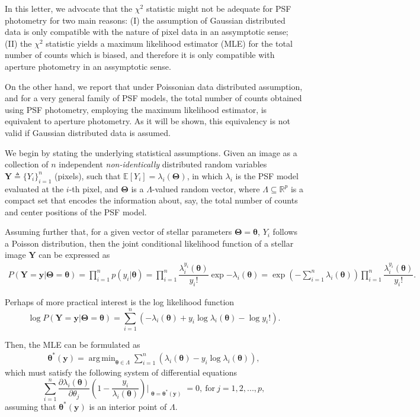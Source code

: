 \documentclass{rnaastex}
\DeclareMathOperator*{\argmin}{arg\,min}
\begin{document}
In this letter, we advocate that the $\chi^2$ statistic might not be adequate for PSF photometry for two main
reasons: (I) the assumption of Gaussian distributed data is only compatible with
the nature of pixel data in an assymptotic sense;
(II) the $\chi^2$ statistic yields a maximum likelihood estimator (MLE) for the
total number of counts which is biased, and therefore it is only compatible
with aperture photometry in an assymptotic sense.

On the other hand, we report that under Poissonian data distributed assumption, and for a very
general family of PSF models, the total number of counts obtained using PSF photometry,
employing the maximum likelihood estimator, is equivalent to aperture photometry.
As it will be shown, this equivalency is not valid if Gaussian distributed data is assumed.

We begin by stating the underlying statistical assumptions.
Given an image as a collection of $n$ independent \emph{non-identically}
distributed random variables $\bm{Y} \triangleq \{Y_i\}_{i=1}^{n}$ (pixels), such that
$\mathbb{E}\left[Y_i\right] = \lambda_i(\bm{\Theta})$, in which $\lambda_i$ is the PSF model evaluated
at the $i$-th pixel, and $\bm{\Theta}$ is a $\Lambda$-valued random vector, where
$\Lambda \subseteq \mathbb{R}^p$ is a compact set that encodes the information about, say, the total number
of counts and center positions of the PSF model.

Assuming further that, for a given vector of stellar parameters $\bm{\Theta} = \bm{\theta}$,
$Y_i$ follows a Poisson distribution, then the joint conditional likelihood function of a
stellar image $\bm{Y}$ can be expressed as~\citep{grimmett:2001}
\begin{align}
    P(\bm{Y} = \bm{y} | \bm{\Theta} = \bm{\theta}) = \prod_{i=1}^{n} p(y_i | \bm{\theta}) = \prod_{i=1}^{n}\dfrac{\lambda_i^{y_i}(\bm{\theta})}{y_i!}\exp{-\lambda_i(\bm{\theta})} = \exp\left({-\sum_{i=1}^{n}\lambda_i(\bm{\theta})}\right)\prod_{i=1}^{n}\dfrac{\lambda_i^{y_i}(\bm{\theta})}{y_i!}.
\end{align}

Perhaps of more practical interest is the log likelihood function
\begin{equation}
    \log P(\bm{Y} = \bm{y} | \bm{\Theta} = \bm{\theta}) = \sum_{i=1}^{n}\left(- \lambda_i(\bm{\theta}) + y_i\log\lambda_i(\bm{\theta}) - \log y_i !\right).
\end{equation}

Then, the MLE can be formulated as
\begin{align}
    \bm{\theta}^{*}(\bm{y}) = \argmin_{\bm{\theta} \in \Lambda} \sum_{i=1}^{n}\left(\lambda_i(\bm{\theta}) - y_i\log\lambda_i(\bm{\theta})\right),
\end{align}
which must satisfy the following system of differential equations
\begin{equation}
    \sum_{i=1}^{n}\dfrac{\partial \lambda_i(\bm{\theta})}{\partial \theta_j}\left(1 - \dfrac{y_i}{\lambda_i(\bm{\theta})} \right)\Bigr|_{\substack{\bm{\theta}=\bm{\theta}^{*}(\bm{y})}} = 0,~\mathrm{for}~j=1, 2, ..., p,
    \label{eq:partial_eqs}
\end{equation}
assuming that $\bm{\theta}^{*}(\bm{y})$ is an interior point of $\Lambda$.
\end{document}
